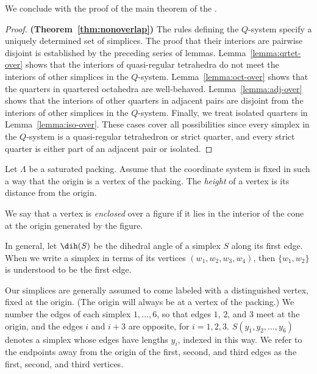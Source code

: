 
We conclude with the proof of the main theorem of the \chap.

\begin{proof} {\bf (Theorem~\ref{thm:nonoverlap})}
The rules defining the $Q$-system specify a uniquely determined
set of simplices.  The proof that their interiors are pairwise
disjoint is established by the preceding series of lemmas.
Lemma~\ref{lemma:qrtet-over} shows that the interiors of
quasi-regular tetrahedra do not meet the interiors of other
simplices in the $Q$-system. Lemma~\ref{lemma:oct-over} shows that
the quarters in quartered octahedra are well-behaved.
Lemma~\ref{lemma:adj-over} shows that the interiors of other
quarters in adjacent pairs are disjoint from the interiors of
other simplices in the $Q$-system. Finally, we treat isolated
quarters in Lemma~\ref{lemma:iso-over}. These cases cover all
possibilities since every simplex in the $Q$-system is a
quasi-regular tetrahedron or strict quarter, and every strict
quarter is either part of an adjacent pair or isolated.
\end{proof}


\begin{definition} \label{def:height}  Let $\Lambda$ be a
saturated packing.  Assume that the coordinate system is fixed in
such a way that the origin is a vertex of the packing.  The {\it
height\/} of a vertex is its distance from the origin.
%
\end{definition}

\begin{definition} \label{def:enclosed}
We say that a vertex is {\it enclosed\/} over a figure if it lies
in the interior of the cone at the origin generated by the figure.
%
\end{definition}

\begin{definition}\label{def:dih}
In general, let $\dih(S)$ be the dihedral angle of a simplex $S$
along its first edge. When we write a simplex in terms of its
vertices $(w_1,w_2,w_3,w_4)$, then $\{w_1,w_2\}$ is understood to
be the first edge.
%
\end{definition}


Our simplices are generally assumed to come labeled with a
distinguished vertex, fixed  at the origin. (The origin will
always be at a vertex of the packing.) We number the edges of each
simplex $1,\ldots,6$, so that edges $1$, $2$, and $3$ meet at the
origin, and the edges $i$ and $i+3$ are opposite, for $i=1,2,3$.
$S(y_1,y_2,\ldots,y_6)$ denotes a simplex whose edges have lengths
$y_i$, indexed in this way. We refer to the endpoints away from
the origin of the first, second, and third edges as the first,
second, and third vertices.
%



